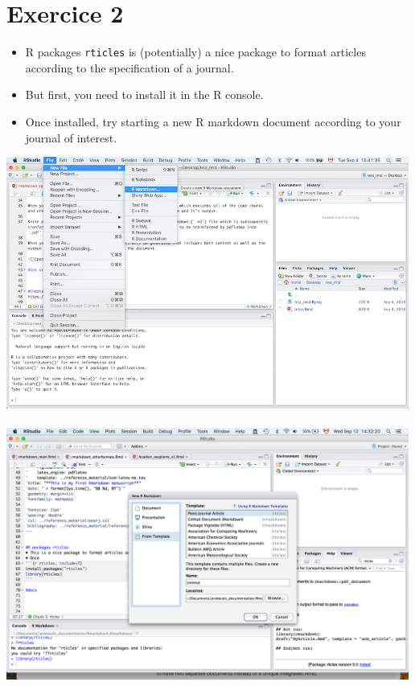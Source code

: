 \documentclass[]{article}
\begin{document}
\hypertarget{exercice-2}{%
\section{Exercice 2}\label{exercice-2}}

\begin{itemize}
\item
  R packages \texttt{rticles} is (potentially) a nice package to format
  articles according to the specification of a journal.
\item
  But first, you need to install it in the R console.
\item
  Once installed, try starting a new R markdown document according to
  your journal of interest.
\end{itemize}

\includegraphics[width=5.20833in,height=\textheight]{../figures/getstarted.png}\\
\hspace*{0.333em}\\
\includegraphics[width=5.20833in,height=\textheight]{../figures/from_template.png}\\
\hspace*{0.333em}
\end{document}
